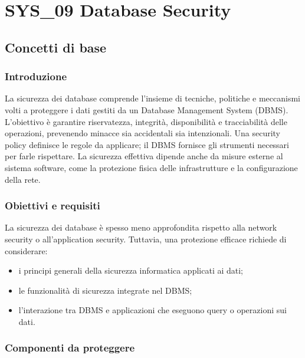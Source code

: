 \newpage
\section{SYS\_09 Database Security}

\subsection{Concetti di base}

\subsubsection{Introduzione}

La sicurezza dei database comprende l'insieme di tecniche, politiche e meccanismi volti a proteggere i dati gestiti da un Database Management System (DBMS). L’obiettivo è garantire riservatezza, integrità, disponibilità e tracciabilità delle operazioni, prevenendo minacce sia accidentali sia intenzionali.
Una security policy definisce le regole da applicare; il DBMS fornisce gli strumenti necessari per farle rispettare. La sicurezza effettiva dipende anche da misure esterne al sistema software, come la protezione fisica delle infrastrutture e la configurazione della rete.

\subsubsection{Obiettivi e requisiti}

La sicurezza dei database è spesso meno approfondita rispetto alla network security o all'application security. Tuttavia, una protezione efficace richiede di considerare:
\begin{itemize}
    \item i principi generali della sicurezza informatica applicati ai dati;
    \item le funzionalità di sicurezza integrate nel DBMS;
    \item l’interazione tra DBMS e applicazioni che eseguono query o operazioni sui dati.
\end{itemize}

\subsubsection{Componenti da proteggere}


